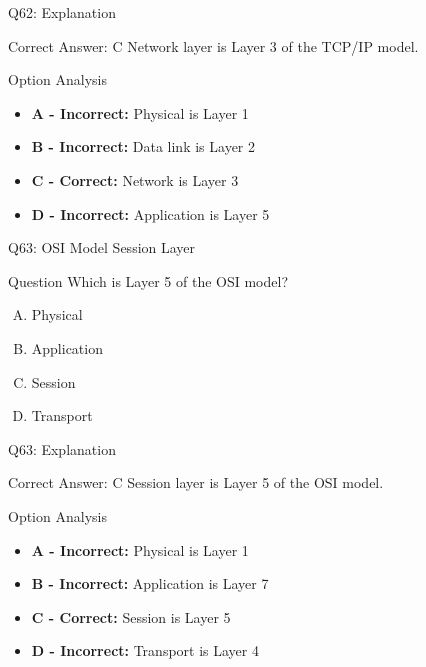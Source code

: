 \documentclass{beamer}
\begin{document}
	\begin{frame}{Q62: Explanation}
		\begin{block}{Correct Answer: C}
			Network layer is Layer 3 of the TCP/IP model.
		\end{block}
		\begin{block}{Option Analysis}
			\begin{itemize}
				\item \textbf{A - Incorrect:} Physical is Layer 1
				\item \textbf{B - Incorrect:} Data link is Layer 2
				\item \textbf{C - Correct:} Network is Layer 3
				\item \textbf{D - Incorrect:} Application is Layer 5
			\end{itemize}
		\end{block}
	\end{frame}
	
	\begin{frame}{Q63: OSI Model Session Layer}
		\begin{block}{Question}
			Which is Layer 5 of the OSI model?
		\end{block}
		\begin{enumerate}[(A)]
			\item Physical
			\item Application
			\item Session
			\item Transport
		\end{enumerate}
	\end{frame}
	
	\begin{frame}{Q63: Explanation}
		\begin{block}{Correct Answer: C}
			Session layer is Layer 5 of the OSI model.
		\end{block}
		\begin{block}{Option Analysis}
			\begin{itemize}
				\item \textbf{A - Incorrect:} Physical is Layer 1
				\item \textbf{B - Incorrect:} Application is Layer 7
				\item \textbf{C - Correct:} Session is Layer 5
				\item \textbf{D - Incorrect:} Transport is Layer 4
			\end{itemize}
		\end{block}
	\end{frame}
	
\end{document}

